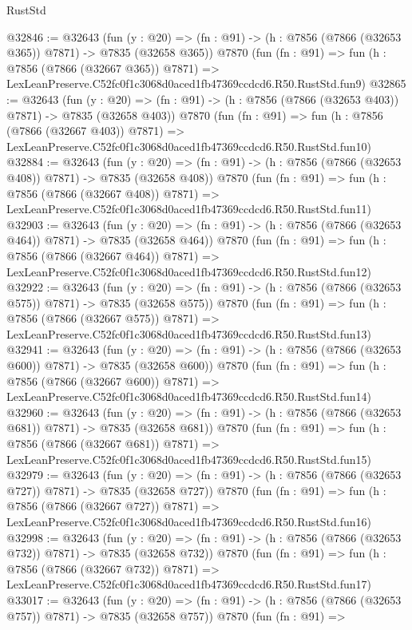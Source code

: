 \begin{lexlean}{RustStd}
\begin{coremodule}
@32846 := @32643
    (fun (y : @20) => (fn : @91) -> (h : @7856 (@7866 (@32653 @365)) @7871) -> @7835 (@32658 @365))
    @7870
    (fun (fn : @91) =>
    fun (h : @7856 (@7866 (@32667 @365)) @7871) =>
    LexLeanPreserve.C52fc0f1c3068d0aced1fb47369ccdcd6.R50.RustStd.fun9)
@32865 := @32643
    (fun (y : @20) => (fn : @91) -> (h : @7856 (@7866 (@32653 @403)) @7871) -> @7835 (@32658 @403))
    @7870
    (fun (fn : @91) =>
    fun (h : @7856 (@7866 (@32667 @403)) @7871) =>
    LexLeanPreserve.C52fc0f1c3068d0aced1fb47369ccdcd6.R50.RustStd.fun10)
@32884 := @32643
    (fun (y : @20) => (fn : @91) -> (h : @7856 (@7866 (@32653 @408)) @7871) -> @7835 (@32658 @408))
    @7870
    (fun (fn : @91) =>
    fun (h : @7856 (@7866 (@32667 @408)) @7871) =>
    LexLeanPreserve.C52fc0f1c3068d0aced1fb47369ccdcd6.R50.RustStd.fun11)
@32903 := @32643
    (fun (y : @20) => (fn : @91) -> (h : @7856 (@7866 (@32653 @464)) @7871) -> @7835 (@32658 @464))
    @7870
    (fun (fn : @91) =>
    fun (h : @7856 (@7866 (@32667 @464)) @7871) =>
    LexLeanPreserve.C52fc0f1c3068d0aced1fb47369ccdcd6.R50.RustStd.fun12)
@32922 := @32643
    (fun (y : @20) => (fn : @91) -> (h : @7856 (@7866 (@32653 @575)) @7871) -> @7835 (@32658 @575))
    @7870
    (fun (fn : @91) =>
    fun (h : @7856 (@7866 (@32667 @575)) @7871) =>
    LexLeanPreserve.C52fc0f1c3068d0aced1fb47369ccdcd6.R50.RustStd.fun13)
@32941 := @32643
    (fun (y : @20) => (fn : @91) -> (h : @7856 (@7866 (@32653 @600)) @7871) -> @7835 (@32658 @600))
    @7870
    (fun (fn : @91) =>
    fun (h : @7856 (@7866 (@32667 @600)) @7871) =>
    LexLeanPreserve.C52fc0f1c3068d0aced1fb47369ccdcd6.R50.RustStd.fun14)
@32960 := @32643
    (fun (y : @20) => (fn : @91) -> (h : @7856 (@7866 (@32653 @681)) @7871) -> @7835 (@32658 @681))
    @7870
    (fun (fn : @91) =>
    fun (h : @7856 (@7866 (@32667 @681)) @7871) =>
    LexLeanPreserve.C52fc0f1c3068d0aced1fb47369ccdcd6.R50.RustStd.fun15)
@32979 := @32643
    (fun (y : @20) => (fn : @91) -> (h : @7856 (@7866 (@32653 @727)) @7871) -> @7835 (@32658 @727))
    @7870
    (fun (fn : @91) =>
    fun (h : @7856 (@7866 (@32667 @727)) @7871) =>
    LexLeanPreserve.C52fc0f1c3068d0aced1fb47369ccdcd6.R50.RustStd.fun16)
@32998 := @32643
    (fun (y : @20) => (fn : @91) -> (h : @7856 (@7866 (@32653 @732)) @7871) -> @7835 (@32658 @732))
    @7870
    (fun (fn : @91) =>
    fun (h : @7856 (@7866 (@32667 @732)) @7871) =>
    LexLeanPreserve.C52fc0f1c3068d0aced1fb47369ccdcd6.R50.RustStd.fun17)
@33017 := @32643
    (fun (y : @20) => (fn : @91) -> (h : @7856 (@7866 (@32653 @757)) @7871) -> @7835 (@32658 @757))
    @7870
    (fun (fn : @91) =>

\end{coremodule}
\end{lexlean}
